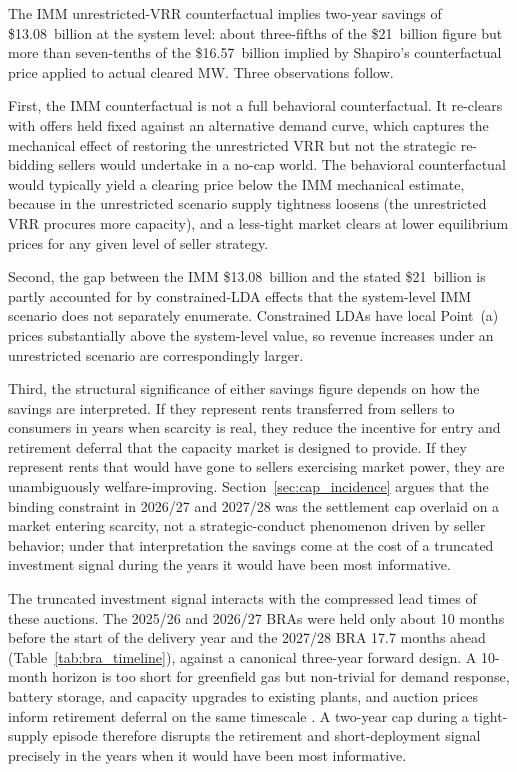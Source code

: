The IMM unrestricted-VRR counterfactual implies two-year savings of
\$13.08~billion at the system level: about three-fifths of the
\$21~billion figure but more than seven-tenths of the \$16.57~billion
implied by Shapiro's counterfactual price applied to actual cleared
MW. Three observations follow.

First, the IMM counterfactual is not a full behavioral counterfactual.
It re-clears with offers held fixed against an alternative demand
curve, which captures the mechanical effect of restoring the
unrestricted VRR but not the strategic re-bidding sellers would
undertake in a no-cap world. The behavioral counterfactual would
typically yield a clearing price below the IMM mechanical estimate,
because in the unrestricted scenario supply tightness loosens (the
unrestricted VRR procures more capacity), and a less-tight market
clears at lower equilibrium prices for any given level of seller
strategy.

Second, the gap between the IMM \$13.08~billion and the stated
\$21~billion is partly accounted for by constrained-LDA effects that
the system-level IMM scenario does not separately enumerate. Constrained
LDAs have local Point~(a) prices substantially above the system-level
value, so revenue increases under an unrestricted scenario are
correspondingly larger.

Third, the structural significance of either savings figure depends on
how the savings are interpreted. If they represent rents transferred
from sellers to consumers in years when scarcity is real, they reduce
the incentive for entry and retirement deferral that the capacity
market is designed to provide. If they represent rents that would have
gone to sellers exercising market power, they are unambiguously
welfare-improving. Section~\ref{sec:cap_incidence} argues that the
binding constraint in 2026/27 and 2027/28 was the settlement cap
overlaid on a market entering scarcity, not a strategic-conduct
phenomenon driven by seller behavior; under that interpretation the
savings come at the cost of a truncated investment signal during the
years it would have been most informative.

The truncated investment signal interacts with the compressed lead
times of these auctions. The 2025/26 and 2026/27 BRAs were held only
about 10 months before the start of the delivery year and the 2027/28
BRA 17.7 months ahead (Table~\ref{tab:bra_timeline}), against a
canonical three-year forward design. A 10-month horizon is too short
for greenfield gas but non-trivial for demand response, battery storage,
and capacity upgrades to existing plants, and auction prices inform
retirement deferral on the same timescale \citep{Cramton2005_capacity}.
A two-year cap during a tight-supply episode therefore disrupts the
retirement and short-deployment signal precisely in the years when it
would have been most informative.

